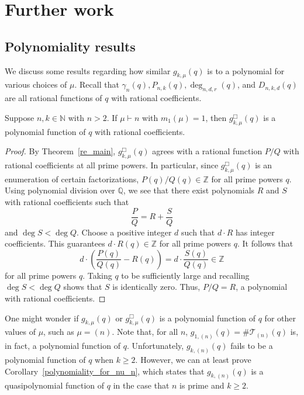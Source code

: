\documentclass[Unicode,ALCO]{cedram}
\newcommand{\N}{\mathbb{N}}
\newcommand{\Q}{\mathbb{Q}}
\newcommand{\CT}{\mathcal{T}}
\newcommand{\Z}{\mathbb{Z}}
\begin{document}
\section{Further work}
\label{outro}

\subsection{Polynomiality results}

We discuss some results regarding how similar \(g_{k,\mu}(q)\) is to a polynomial for various choices of \(\mu\).
Recall that \(\gamma_n (q), P_{n,k} (q), \deg_{n,d,r} (q)\), and \(D_{n,k,d} (q)\) are all rational functions of \(q\) with rational coefficients.

\begin{corollary}
\label{full_polynomiality_for_some}
Suppose \(n, k \in \N\) with \(n > 2\).
If \(\mu \vdash n\) with \(m_1(\mu) = 1\), then \(g_{k,\mu}^\Box (q)\) is a polynomial function of \(q\) with rational coefficients.
\end{corollary}

\begin{proof}
By Theorem~\ref{re_main}, \(g^\Box_{k,\mu} (q)\) agrees with a rational function \(P / Q\) with rational coefficients at all prime powers.
In particular, since \(g^\Box_{k,\mu} (q)\) is an enumeration of certain factorizations, \(P(q) / Q(q) \in \Z\) for all prime powers \(q\).
Using polynomial division over \(\Q\),
we see that there exist polynomials \(R\) and \(S\) with rational coefficients such that
\begin{equation}
	\label{rational_fractional_etc}
	\frac{P}{Q} = R + \frac{S}{Q}
\end{equation}
and \(\deg S < \deg Q\).
Choose a positive integer \(d\) such that \(d \cdot R\) has integer coefficients.
This guarantees \(d \cdot R(q) \in \Z\) for all prime powers \(q\).
It follows that
\begin{equation}
	d \cdot \left ( \frac{P(q)}{Q(q)} - R(q) \right ) = d \cdot \frac{S(q)}{Q(q)} \in \Z
\end{equation}
for all prime powers \(q\).
Taking \(q\) to be sufficiently large and recalling \(\deg S < \deg Q\) shows that \(S\) is identically zero.
Thus, \(P/Q = R\), a polynomial with rational coefficients.
\end{proof}

One might wonder if \(g_{k,\mu} (q)\) or \(g^\Box_{k,\mu} (q)\) is a polynomial function of \(q\) for other values of \(\mu\), such as \(\mu = (n)\).
Note that, for all \(n\), \(g_{1,(n)} (q) = \# \CT_{(n)} (q)\) is, in fact, a polynomial function of \(q\).
Unfortunately, \(g_{k,(n)}(q)\) fails to be a polynomial function of \(q\) when \(k \geq 2\).
However, we can at least prove Corollary~\ref{polynomiality_for_nu_n}, which states that \(g_{k,(n)} (q)\) is a quasipolynomial function of \(q\) in the case that \(n\) is prime and \(k \geq 2\).
\end{document}
